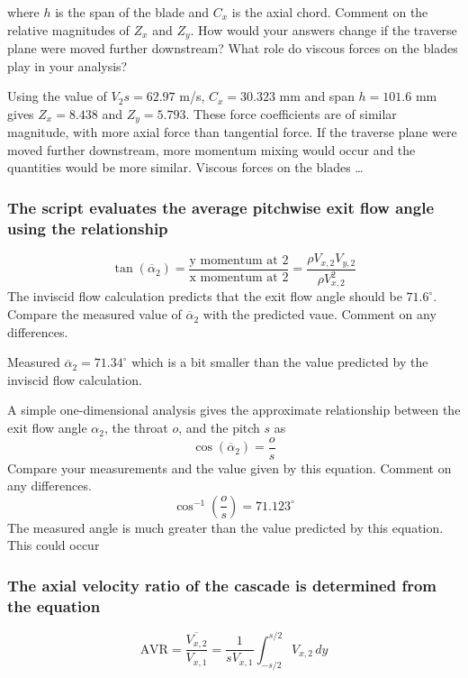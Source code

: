 \documentclass{article}
\begin{document}
where $h$ is the span of the blade and $C_x$ is the axial chord. Comment on the relative magnitudes
of $Z_x$ and $Z_y$. How would your answers change if the traverse plane were moved further
downstream? What role do viscous forces on the blades play in your analysis?

Using the value of $V_2s = 62.97$ m/s, $C_x = 30.323$ mm and span $h=101.6$ mm gives $Z_x = 8.438$ and $Z_y = 5.793$.
These force coefficients are of similar magnitude, with more axial force than tangential force.
If the traverse plane were moved further downstream, more momentum mixing would occur and the quantities would be more similar.
Viscous forces on the blades \dots

\subsubsection{The script evaluates the average pitchwise exit flow angle using the relationship
}
\begin{equation}
    \tan (\overline{\alpha}_2) = \frac{\text{y momentum at 2}}{\text{x momentum at 2}} = \frac{\rho V_{x,2}V_{y,2}}{\rho V_{x,2}^2} \label{eq:alpha2}
\end{equation}
The inviscid flow calculation predicts that the exit flow angle should be $71.6^\circ$. Compare the
measured value of $\overline{\alpha}_2$ with the predicted vaue. Comment on any differences.

Measured $\overline{\alpha}_2 = 71.34^\circ$ which is a bit smaller than the value predicted by the inviscid flow calculation.
% 


A simple one-dimensional analysis gives the approximate relationship between the exit flow angle $\alpha_2$, the throat $o$, and the pitch $s$ as
\begin{equation}
    \cos (\overline{\alpha}_2) = \frac{o}{s}
\end{equation}
Compare your measurements and the value given by this equation. Comment on any
differences.
\begin{equation}
    \cos^{-1}\left( \frac{o}{s} \right) = 71.123^\circ
\end{equation}
The measured angle is much greater than the value predicted by this equation.
This could occur 

\subsubsection{The axial velocity ratio of the cascade is determined from the equation
}
\begin{equation}
    \text{AVR} = \frac{\overline{V_{x,2}}}{V_{x,1}} = \frac{1}{s V_{x,1}} \int_{-s/2}^{s/2} V_{x,2} \, dy
\end{equation}
\end{document}
